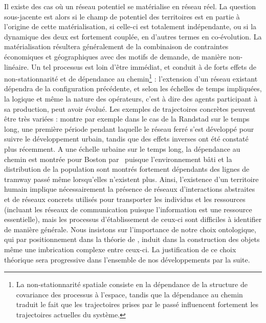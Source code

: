 {Il existe des cas où un réseau potentiel se matérialise en réseau réel. La question sous-jacente est alors si le champ de potentiel des territoires est en partie à l'origine de cette matérialisation, si celle-ci est totalement indépendante, ou si la dynamique des deux est fortement couplée, en d'autres termes en co-évolution. La matérialisation résultera généralement de la combinaison de contraintes économiques et géographiques avec des motifs de demande, de manière non-linéaire. Un tel processus est loin d'être immédiat, et conduit à de forts effets de non-stationnarité et de dépendance au chemin\footnote{La non-stationnarité spatiale consiste en la dépendance de la structure de covariance des processus à l'espace, tandis que la dépendance au chemin traduit le fait que les trajectoires prises par le passé influencent fortement les trajectoires actuelles du système.} : l'extension d'un réseau existant dépendra de la configuration précédente, et selon les échelles de temps impliquées, la logique et même la nature des opérateurs, c'est à dire des agents participant à sa production, peut avoir évolué. Les exemples de trajectoires concrètes peuvent être très variées : \cite{kasraian2015development} montre par exemple dans le cas de la Randstad sur le temps long, une première période pendant laquelle le réseau ferré s'est développé pour suivre le développement urbain, tandis que des effets inverses ont été constaté plus récemment. A une échelle urbaine sur le temps long, la dépendance au chemin est montrée pour Boston par~\cite{block2012hysteresis} puisque l'environnement bâti et la distribution de la population sont montrés fortement dépendants des lignes de tramway passé même lorsqu'elles n'existent plus. Ainsi, l'existence d'un territoire humain implique nécessairement la présence de réseaux d'interactions abstraites et de réseaux concrets utilisés pour transporter les individus et les ressources (incluant les réseaux de communication puisque l'information est une ressource essentielle), mais les processus d'établissement de ceux-ci sont difficiles à identifier de manière générale. Nous insistons sur l'importance de notre choix ontologique, qui par positionnement dans la théorie de , induit dans la construction des objets même une imbrication complexe entre ceux-ci. La justification de  ce choix théorique sera progressive dans l'ensemble de nos développements par la suite.
}





